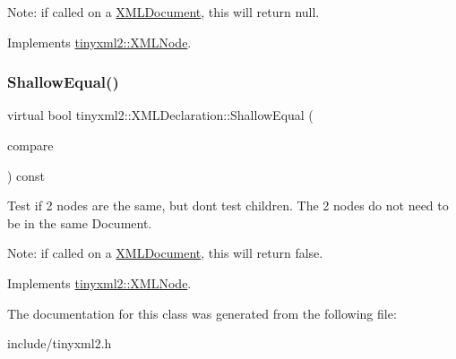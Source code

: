 Note\+: if called on a \mbox{\hyperlink{classtinyxml2_1_1XMLDocument}{X\+M\+L\+Document}}, this will return null. 

Implements \mbox{\hyperlink{classtinyxml2_1_1XMLNode_a8402cbd3129d20e9e6024bbcc0531283}{tinyxml2\+::\+X\+M\+L\+Node}}.

\mbox{\label{classtinyxml2_1_1XMLDeclaration_aa26b70011694e9b9e9480b929e9b78d6}} 
\subsubsection{\texorpdfstring{ShallowEqual()}{ShallowEqual()}}
{\footnotesize\ttfamily virtual bool tinyxml2\+::\+X\+M\+L\+Declaration\+::\+Shallow\+Equal (\begin{DoxyParamCaption}\item[{const \mbox{\hyperlink{classtinyxml2_1_1XMLNode}{X\+M\+L\+Node}} $\ast$}]{compare }\end{DoxyParamCaption}) const\hspace{0.3cm}{\ttfamily [virtual]}}

Test if 2 nodes are the same, but don\textquotesingle{}t test children. The 2 nodes do not need to be in the same Document.

Note\+: if called on a \mbox{\hyperlink{classtinyxml2_1_1XMLDocument}{X\+M\+L\+Document}}, this will return false. 

Implements \mbox{\hyperlink{classtinyxml2_1_1XMLNode_a7ce18b751c3ea09eac292dca264f9226}{tinyxml2\+::\+X\+M\+L\+Node}}.



The documentation for this class was generated from the following file\+:\begin{DoxyCompactItemize}
\item 
include/tinyxml2.\+h\end{DoxyCompactItemize}
